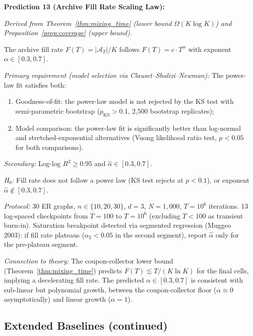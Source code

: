 \documentclass{article}
\theoremstyle{definition}
\theoremstyle{plain}
\theoremstyle{remark}
\begin{document}
\medskip

\textbf{Prediction 13 (Archive Fill Rate Scaling Law):}
\label{pred:fill_rate}

\emph{Derived from Theorem~\ref{thm:mixing_time} (lower bound
$\Omega(K \log K)$) and Proposition~\ref{prop:coverage} (upper bound).}

The archive fill rate $F(T) = |\mathcal{A}_T| / K$ follows
$F(T) = c \cdot T^\alpha$ with exponent $\alpha \in [0.3, 0.7]$.

\emph{Primary requirement (model selection via Clauset--Shalizi--Newman):}
The power-law fit satisfies both:
\begin{enumerate}
  \item[(i)] Goodness-of-fit: the power-law model is not rejected by
    the KS test with semi-parametric bootstrap ($p_{\mathrm{KS}} > 0.1$,
    2{,}500 bootstrap replicates);
  \item[(ii)] Model comparison: the power-law fit is significantly better
    than log-normal and stretched-exponential alternatives (Vuong
    likelihood ratio test, $p < 0.05$ for both comparisons).
\end{enumerate}

\emph{Secondary:} Log-log $R^2 \geq 0.95$ and
$\hat{\alpha} \in [0.3, 0.7]$.

\emph{H$_0$:} Fill rate does not follow a power law (KS test rejects at
$p < 0.1$), or exponent $\hat{\alpha} \notin [0.3, 0.7]$.

\emph{Protocol:} 30 ER graphs, $n \in \{10, 20, 30\}$, $d = 3$,
$N = 1{,}000$, $T = 10^6$ iterations. 13 log-spaced checkpoints from
$T = 100$ to $T = 10^6$ (excluding $T < 100$ as transient burn-in).
Saturation breakpoint detected via segmented regression (Muggeo 2003):
if fill rate plateaus ($\alpha_2 < 0.05$ in the second segment), report
$\hat{\alpha}$ only for the pre-plateau segment.

\emph{Connection to theory:} The coupon-collector lower bound
(Theorem~\ref{thm:mixing_time}) predicts $F(T) \lesssim T / (K \ln K)$
for the final cells, implying a decelerating fill rate. The predicted
$\alpha \in [0.3, 0.7]$ is consistent with sub-linear but polynomial
growth, between the coupon-collector floor ($\alpha \approx 0$
asymptotically) and linear growth ($\alpha = 1$).


\subsection*{Extended Baselines (continued)}
\end{document}
